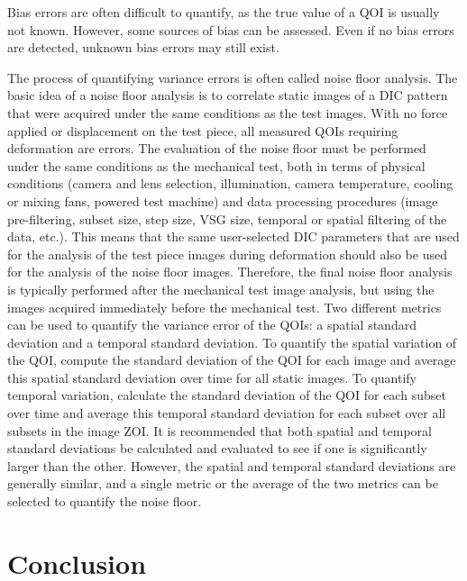 Bias errors are often difficult to quantify, as the true value of a QOI is usually not known. However, some sources of bias can be assessed. Even if no bias errors are detected, unknown bias errors may still exist.

The process of quantifying variance errors is often called noise floor analysis. The basic idea of a noise floor analysis is to correlate static images of a DIC pattern that were acquired under the same conditions as the test images. With no force applied or displacement on the test piece, all measured QOIs requiring deformation are errors. The evaluation of the noise floor must be performed under the same conditions as the mechanical test, both in terms of physical conditions (camera and lens selection, illumination, camera temperature, cooling or mixing fans, powered test machine) and data processing procedures (image pre-filtering, subset size, step size, VSG size, temporal or spatial filtering of the data, etc.). This means that the same user-selected DIC parameters that are used for the analysis of the test piece images during deformation should also be used for the analysis of the noise floor images. Therefore, the final noise floor analysis is typically performed after the mechanical test image analysis, but using the images acquired immediately before the mechanical test.
Two different metrics can be used to quantify the variance error of the QOIs: a spatial standard deviation and a temporal standard deviation. To quantify the spatial variation of the QOI, compute the standard deviation of the QOI for each image and average this spatial standard deviation over time for all static images. To quantify temporal variation, calculate the standard deviation of the QOI for each subset over time and average this temporal standard deviation for each subset over all subsets in the image ZOI. It is recommended that both spatial and temporal standard deviations be calculated and evaluated to see if one is significantly larger than the other. However, the spatial and temporal standard deviations are generally similar, and a single metric or the average of the two metrics can be selected to quantify the noise floor. 

\section{Conclusion}

